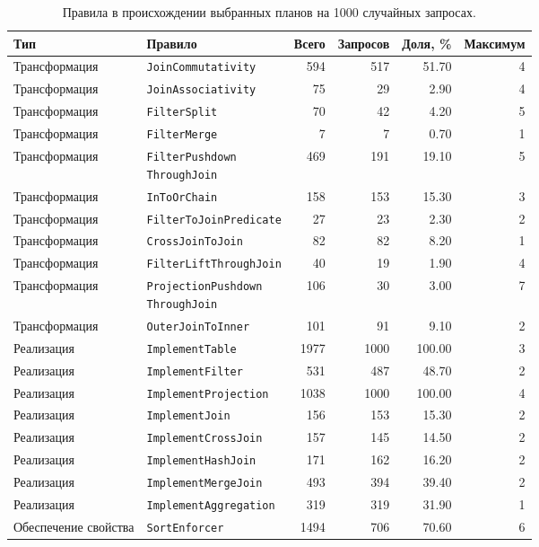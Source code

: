 \documentclass[14pt, russian]{scrartcl}
\begin{document}
\begin{table}[H]
  \centering
  \scriptsize
  \setlength{\tabcolsep}{3pt}
  \caption{Правила в происхождении выбранных планов на 1000 случайных запросах.}
  \label{tbl:rule-lineage-random}
  \begin{tabular}{|p{2.6cm}|p{5.0cm}|r|r|r|r|}
    \hline
    Тип & Правило & Всего & Запросов & Доля, \% & Максимум \\
    \hline
    Трансформация & \texttt{JoinCommutativity} & 594 & 517 & 51.70 & 4 \\
    Трансформация & \texttt{JoinAssociativity} & 75 & 29 & 2.90 & 4 \\
    Трансформация & \texttt{FilterSplit} & 70 & 42 & 4.20 & 5 \\
    Трансформация & \texttt{FilterMerge} & 7 & 7 & 0.70 & 1 \\
    Трансформация & \makecell[l]{\texttt{FilterPushdown}\\\texttt{ThroughJoin}} & 469 & 191 & 19.10 & 5 \\
    Трансформация & \texttt{InToOrChain} & 158 & 153 & 15.30 & 3 \\
    Трансформация & \texttt{FilterToJoinPredicate} & 27 & 23 & 2.30 & 2 \\
    Трансформация & \texttt{CrossJoinToJoin} & 82 & 82 & 8.20 & 1 \\
    Трансформация & \texttt{FilterLiftThroughJoin} & 40 & 19 & 1.90 & 4 \\
    Трансформация & \makecell[l]{\texttt{ProjectionPushdown}\\\texttt{ThroughJoin}} & 106 & 30 & 3.00 & 7 \\
    Трансформация & \texttt{OuterJoinToInner} & 101 & 91 & 9.10 & 2 \\
    Реализация & \texttt{ImplementTable} & 1977 & 1000 & 100.00 & 3 \\
    Реализация & \texttt{ImplementFilter} & 531 & 487 & 48.70 & 2 \\
    Реализация & \texttt{ImplementProjection} & 1038 & 1000 & 100.00 & 4 \\
    Реализация & \texttt{ImplementJoin} & 156 & 153 & 15.30 & 2 \\
    Реализация & \texttt{ImplementCrossJoin} & 157 & 145 & 14.50 & 2 \\
    Реализация & \texttt{ImplementHashJoin} & 171 & 162 & 16.20 & 2 \\
    Реализация & \texttt{ImplementMergeJoin} & 493 & 394 & 39.40 & 2 \\
    Реализация & \texttt{ImplementAggregation} & 319 & 319 & 31.90 & 1 \\
    Обеспечение свойства & \texttt{SortEnforcer} & 1494 & 706 & 70.60 & 6 \\
    \hline
  \end{tabular}
\end{table}
\end{document}
